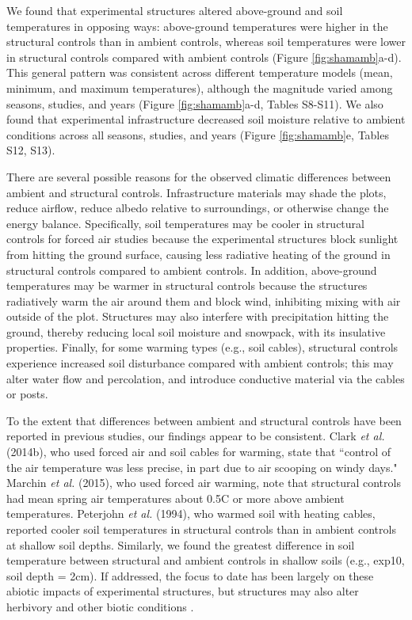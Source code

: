 \documentclass{article}
\begin{document}
\par We found that experimental structures altered above-ground and soil temperatures in opposing ways: above-ground temperatures were higher in the structural controls than in ambient controls, whereas soil temperatures were lower in structural controls compared with ambient controls (Figure \ref{fig:shamamb}a-d). This general pattern was consistent across different temperature models (mean, minimum, and maximum temperatures), although the magnitude varied among seasons, studies, and years (Figure \ref{fig:shamamb}a-d, Tables S8-S11). We also found that experimental infrastructure decreased soil moisture relative to ambient conditions across all seasons, studies, and years (Figure \ref{fig:shamamb}e, Tables S12, S13). 
\par There are several possible reasons for the observed climatic differences between ambient and structural controls. Infrastructure materials may shade the plots, reduce airflow, reduce albedo relative to surroundings, or otherwise change the energy balance. Specifically, soil temperatures may be cooler in structural controls for forced air studies because the experimental structures block sunlight from hitting the ground surface, causing less radiative heating of the ground in structural controls compared to ambient controls. In addition, above-ground temperatures may be warmer in structural controls because the structures radiatively warm the air around them and block wind, inhibiting mixing with air outside of the plot. Structures may also interfere with precipitation hitting the ground, thereby reducing local soil moisture and snowpack, with its insulative properties. Finally, for some warming types (e.g., soil cables), structural controls experience increased soil disturbance compared with ambient controls; this may alter water flow and percolation, and introduce conductive material via the cables or posts. 

\par To the extent that differences between ambient and structural controls have been reported in previous studies, our findings appear to be consistent. Clark \textit{et al.} (2014b), who used forced air and soil cables for warming, state that ``control of the air temperature was less precise, in part due to air scooping on windy days." Marchin \textit{et al.} (2015), who used forced air warming, note that structural controls had mean spring air temperatures about 0.5\degree C or more above ambient temperatures. Peterjohn \textit{et al.} (1994), who warmed soil with heating cables, reported cooler soil temperatures in structural controls than in ambient controls at shallow soil depths. Similarly, we found the greatest difference in soil temperature between structural and ambient controls in shallow soils (e.g., exp10, soil depth = 2cm). If addressed, the focus to date has been largely on these abiotic impacts of experimental structures, but structures may also alter herbivory and other biotic conditions \citep{kennedy1995,moise2010,wolkovich2012,hoeppner2012}. 
\end{document}
